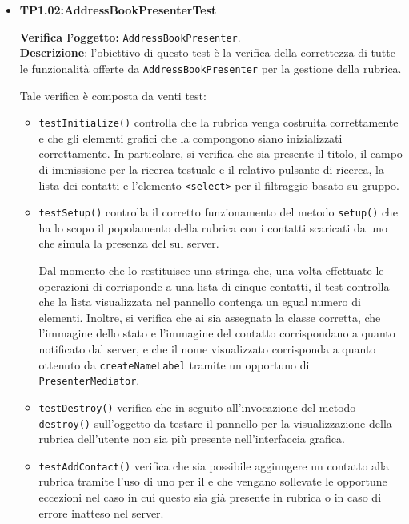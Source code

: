 \begin{itemize}
\item \textbf{TP1.02:AddressBookPresenterTest}

\textbf{Verifica l'oggetto:} \texttt{AddressBookPresenter}.\\
\textbf{Descrizione}: l'obiettivo di questo test è la verifica della correttezza di tutte le funzionalità offerte da \texttt{AddressBookPresenter} per la gestione della rubrica.

Tale verifica è composta da venti test:
\begin{itemize}
\item \texttt{testInitialize()} controlla che la rubrica venga costruita correttamente e che gli elementi grafici che la compongono siano inizializzati correttamente. In particolare, si verifica che sia presente il titolo, il campo di immissione per la ricerca testuale e il relativo pulsante di ricerca, la lista dei contatti e l'elemento \verb'<select>' per il filtraggio basato su gruppo.

\item \texttt{testSetup()} controlla il corretto funzionamento del metodo \verb'setup()' che ha lo scopo il popolamento della rubrica con i contatti scaricati da uno  che simula la presenza del  sul server.

Dal momento che lo  restituisce una stringa che, una volta effettuate le operazioni di  corrisponde a una lista di cinque contatti, il test controlla che la lista visualizzata nel pannello contenga un egual numero di elementi. Inoltre, si verifica che ai  sia assegnata la classe corretta, che l'immagine dello stato e l'immagine del contatto corrispondano a quanto notificato dal server, e che il nome visualizzato corrisponda a quanto ottenuto da \verb'createNameLabel' tramite un opportuno  di \texttt{PresenterMediator}.

\item \texttt{testDestroy()} verifica che in seguito all'invocazione del metodo \verb'destroy()' sull'oggetto da testare il pannello per la visualizzazione della rubrica dell'utente non sia più presente nell'interfaccia grafica.

\item \texttt{testAddContact()} verifica che sia possibile aggiungere un contatto alla rubrica tramite l'uso di uno  per il  e che vengano sollevate le opportune eccezioni nel caso in cui questo sia già presente in rubrica o in caso di errore inatteso nel server.


\end{itemize}
\end{itemize}
